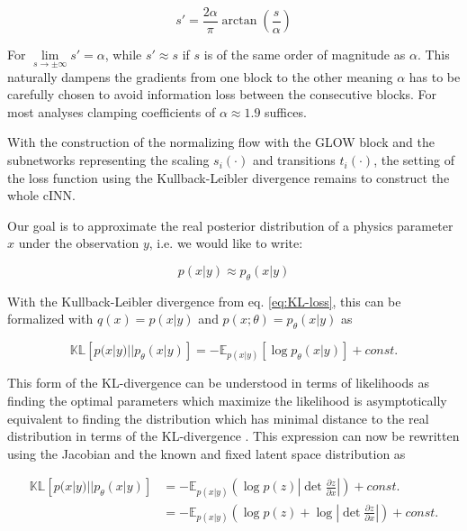 \begin{equation*}
	s' = \frac{2\alpha}{\pi} \arctan\left(\frac{s}{\alpha}\right)
\end{equation*}

For $\lim\limits_{s\rightarrow\pm\infty} s' = \alpha$, while $s' \approx s$ if $s$ is of the same order of magnitude as $\alpha$. This naturally dampens the gradients from one block to the other meaning $\alpha$ has to be carefully chosen to avoid information loss between the consecutive blocks. For most analyses clamping coefficients of $\alpha \approx 1.9$ suffices.

With the construction of the normalizing flow with the GLOW block and the subnetworks representing the scaling $s_i(\cdot)$ and transitions $t_i(\cdot)$, the setting of the loss function using the Kullback-Leibler divergence remains to construct the whole cINN.


Our goal is to approximate the real posterior distribution of a physics parameter $x$ under the observation $y$, i.e. we would like to write:

\begin{equation*}
	p(x | y) \approx p_\theta(x | y)
\end{equation*}

With the Kullback-Leibler divergence from eq. \ref{eq:KL-loss}, this can be formalized with $q(x) = p(x | y)$ and $p(x; \theta) = p_\theta(x | y)$ as

\begin{equation*}
	\mathbb{KL}\left[p(x | y) || p_\theta(x | y) \right] = - \mathbb{E}_{p(x | y)} \left[ \log p_\theta(x | y)\right] + const.
\end{equation*}

This form of the KL-divergence can be understood in terms of likelihoods as finding the optimal parameters which maximize the likelihood is asymptotically equivalent to finding the distribution which has minimal distance to the real distribution in terms of the KL-divergence \cite{Bishop_book}. This expression can now be rewritten using the Jacobian and the known and fixed latent space distribution as

\begin{equation*}
	\begin{aligned}
		\mathbb{KL}\left[p(x | y) || p_\theta(x | y) \right] &= - \mathbb{E}_{p(x | y)}\left(\log p(z) \left|\det\frac{\partial z}{\partial x}\right|\right) + const. \\
		&= - \mathbb{E}_{p(x | y)}\left(\log p(z)  + \log \left|\det\frac{\partial z}{\partial x}\right|\right) + const.
	\end{aligned}
\end{equation*}

